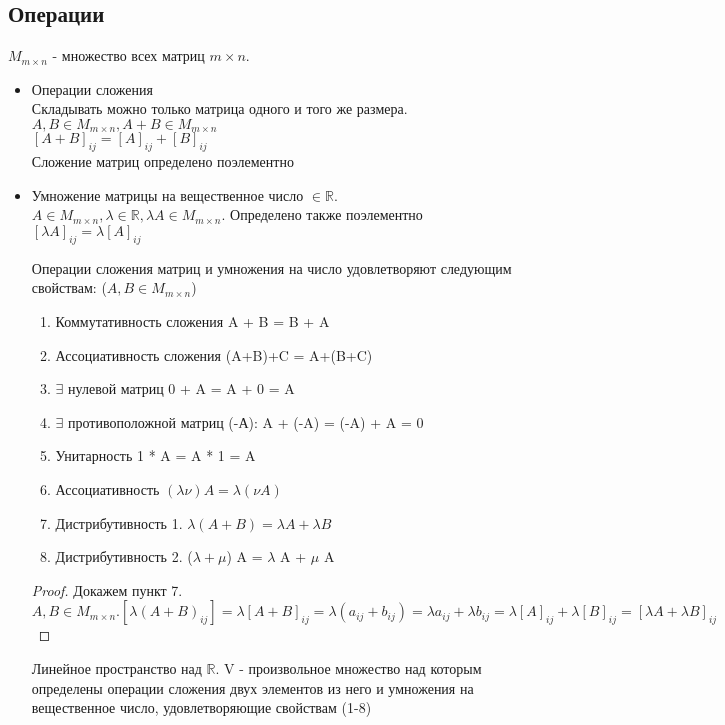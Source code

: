 \subsection{Операции}
\(M_{m\times n}\) - множество всех матриц \(m\times n\).
\begin{itemize}
	\item Операции сложения \\
	Складывать можно только матрица одного и того же размера. \(A, B \in M_{m\times n}, A + B \in M_{m\times n}\)\\
	\([A+B]_{ij} = [A]_{ij}+ [B]_{ij}\)\\
	Сложение матриц определено поэлементно
	\item Умножение матрицы на вещественное число \(\in\mathbb{R}\). \(A\in M_{m\times n}, \lambda \in \mathbb{R}, \lambda A\in M_{m\times n}\). Определено также поэлементно \\
	\([\lambda A]_{ij} = \lambda[A]_{ij}\)
	\begin{theorem}
		Операции сложения матриц и умножения на число удовлетворяют следующим свойствам: (\(A, B \in M_{m\times n}\))
		\begin{enumerate}
			\item Коммутативность сложения A + B = B + A
			\item Ассоциативность сложения (A+B)+C = A+(B+C)
			\item \(\exists\) нулевой матриц 0 + A = A + 0 = A
			\item \(\exists\) противоположной матриц (-А): A + (-A) = (-A) + A = 0
			\item Унитарность 1 * A = A * 1 = A
			\item Ассоциативность \((\lambda\nu)A = \lambda(\nu A)\)
			\item Дистрибутивность 1. \(\lambda(A+B) = \lambda A + \lambda B\)
			\item Дистрибутивность 2. (\(\lambda + \mu\)) A = $\lambda$ A + $\mu$ A
		\end{enumerate}
	\end{theorem}
	\begin{proof}
		Докажем пункт 7. \(A, B \in M_{m\times n}. [\lambda (A+B)_{ij}] = \lambda [A+B]_{ij} = \lambda(a_{ij} + b_{ij}) = \lambda a_{ij} + \lambda b_{ij} = \lambda [A]_{ij} + \lambda [B]_{ij} = [\lambda A +\lambda B]_{ij}\)
	\end{proof}
	\begin{definition}
		Линейное пространство над \(\mathbb{R}\). V - произвольное множество над которым определены операции сложения двух элементов из него и умножения на вещественное число, удовлетворяющие свойствам (1-8)

\end{definition}
\end{itemize}
